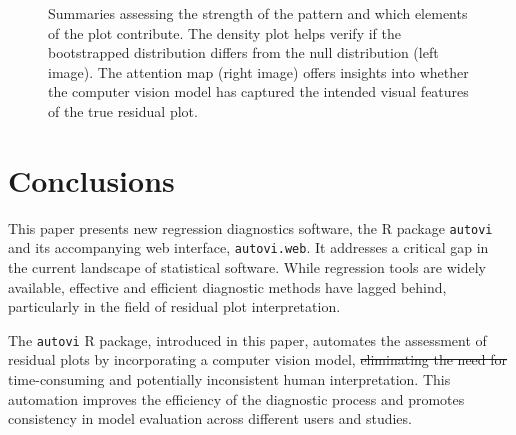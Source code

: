 \documentclass[
doublespace,
  times]{anzsauth}
\providecommand{\DIFadd}[1]{{\protect\color{blue}\uwave{#1}}} %
\providecommand{\DIFdel}[1]{{\protect\color{red}\sout{#1}}}                      %
\providecommand{\DIFaddbegin}{} %
\providecommand{\DIFaddend}{} %
\providecommand{\DIFdelbegin}{} %
\providecommand{\DIFdelend}{} %
\providecommand{\DIFaddbeginFL}{} %
\providecommand{\DIFaddendFL}{} %
\providecommand{\DIFdelbeginFL}{} %
\providecommand{\DIFdelendFL}{} %
\newcommand{\DIFscaledelfig}{0.5}
\newlength{\DIFdelgraphicswidth} %
\newlength{\DIFdelgraphicsheight} %
\newcommand{\DIFaddincludegraphics}[2][]{{\color{blue}\fbox{\DIFOincludegraphics[#1]{#2}}}} %
\newcommand{\DIFdelincludegraphics}[2][]{%
\sbox{\DIFdelgraphicsbox}{\DIFOincludegraphics[#1]{#2}}%
\settoboxwidth{\DIFdelgraphicswidth}{\DIFdelgraphicsbox} %
\settoboxtotalheight{\DIFdelgraphicsheight}{\DIFdelgraphicsbox} %
\scalebox{\DIFscaledelfig}{%
\parbox[b]{\DIFdelgraphicswidth}{\usebox{\DIFdelgraphicsbox}\\[-\baselineskip] \rule{\DIFdelgraphicswidth}{0em}}\llap{\resizebox{\DIFdelgraphicswidth}{\DIFdelgraphicsheight}{%
\setlength{\unitlength}{\DIFdelgraphicswidth}%
\begin{picture}(1,1)%
\thicklines\linethickness{2pt} %
{\color[rgb]{1,0,0}\put(0,0){\framebox(1,1){}}}%
{\color[rgb]{1,0,0}\put(0,0){\line( 1,1){1}}}%
{\color[rgb]{1,0,0}\put(0,1){\line(1,-1){1}}}%
\end{picture}%
}\hspace*{3pt}}} %
} %
\DeclareRobustCommand{\DIFaddbegin}{\DIFOaddbegin \let\includegraphics\DIFaddincludegraphics} %
\DeclareRobustCommand{\DIFaddend}{\DIFOaddend \let\includegraphics\DIFOincludegraphics} %
\DeclareRobustCommand{\DIFdelbegin}{\DIFOdelbegin \let\includegraphics\DIFdelincludegraphics} %
\DeclareRobustCommand{\DIFdelend}{\DIFOaddend \let\includegraphics\DIFOincludegraphics} %
\DeclareRobustCommand{\DIFaddbeginFL}{\DIFOaddbeginFL \let\includegraphics\DIFaddincludegraphics} %
\DeclareRobustCommand{\DIFaddendFL}{\DIFOaddendFL \let\includegraphics\DIFOincludegraphics} %
\DeclareRobustCommand{\DIFdelbeginFL}{\DIFOdelbeginFL \let\includegraphics\DIFdelincludegraphics} %
\DeclareRobustCommand{\DIFdelendFL}{\DIFOaddendFL \let\includegraphics\DIFOincludegraphics} %
\begin{document}
\begin{figure}

\DIFdelbeginFL %


\DIFdelendFL \DIFaddbeginFL {}
\DIFaddendFL

\caption{\label{fig-autovi-web-distributions}Summaries assessing the
strength of the pattern and which elements of the plot contribute. The
density plot helps verify if the bootstrapped distribution differs from
the null distribution (left image). The attention map (right image)
offers insights into whether the computer vision model has captured the
intended visual features of the true residual plot.}

\end{figure}%

\section{Conclusions}\label{sec-autovi-conclusion}

This paper presents new regression diagnostics software, the R package
\texttt{autovi} and its accompanying web interface, \texttt{autovi.web}.
It addresses a critical gap in the current landscape of statistical
software. While regression tools are widely available, effective and
efficient diagnostic methods have lagged behind, particularly in the
field of residual plot interpretation.

The \texttt{autovi} R package, introduced in this paper, automates the
assessment of residual plots by incorporating a computer vision model,
\DIFdelbegin \DIFdel{eliminating the need for }\DIFdelend \DIFaddbegin \DIFadd{reducing reliance on }\DIFaddend time-consuming and potentially inconsistent human
interpretation. This automation improves the efficiency of the
diagnostic process and promotes consistency in model evaluation across
different users and studies.
\end{document}
